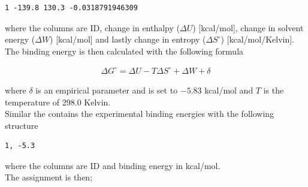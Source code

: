 \documentclass{article}
\begin{document}
\begin{lstlisting}
1 -139.8 130.3 -0.0318791946309
\end{lstlisting}

where the columns are ID, change in enthalpy ($\Delta U$) [kcal/mol], change in solvent energy ($\Delta W$) [kcal/mol] and lastly change in entropy ($\Delta S^\circ$) [kcal/mol/Kelvin].
The binding energy is then calculated with the following formula

\begin{align}
    \Delta G^\circ = \Delta U - T \Delta S^\circ + \Delta W + \delta
\end{align}

where $\delta$ is an empirical parameter and is set to $-5.83$ kcal/mol and $T$ is the temperature of 298.0 Kelvin.\\

Similar the  contains the experimental binding energies with the following structure

\begin{lstlisting}
1, -5.3
\end{lstlisting}

where the columns are ID and binding energy in kcal/mol.\\

The assignment is then;
\end{document}
